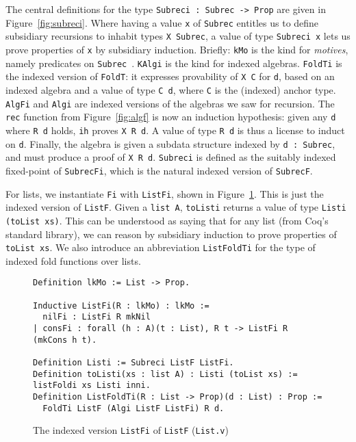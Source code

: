 \documentclass[a4paper,USenglish]{lipics-v2021}
\begin{document}
The central definitions for the type \verb|Subreci : Subrec -> Prop|
are given in Figure~\ref{fig:subreci}.  Where having a value \verb|x|
of \verb|Subrec| entitles us to define subsidiary recursions to
inhabit types \verb|X Subrec|, a value of type \verb|Subreci x| lets
us prove properties of \verb|x| by subsidiary induction.  Briefly:
\verb|kMo| is the kind for \emph{motives}, namely predicates on
\verb|Subrec|~\cite{mcbride00}.  \verb|KAlgi| is the kind for indexed
algebras.  \verb|FoldTi| is the indexed version of \verb|FoldT|: it
expresses provability of \verb|X C| for \verb|d|, based on an indexed
algebra and a value of type \verb|C d|, where \verb|C| is the (indexed) anchor
type.  \verb|AlgFi| and \verb|Algi| are indexed versions
of the algebras we saw for recursion.  The \verb|rec| function from
Figure~\ref{fig:algf} is now an induction hypothesis: given
any \verb|d| where \verb|R d| holds, \verb|ih| proves \verb|X R d|.  A
value of type \verb|R d| is thus a license to induct on \verb|d|.
Finally, the algebra is given a subdata structure indexed by
\verb|d : Subrec|, and must produce a proof of \verb|X R d|.  \verb|Subreci|
is defined as the suitably indexed fixed-point of \verb|SubrecFi|, which
is the natural indexed version of \verb|SubrecF|.

For lists, we instantiate \verb|Fi| with \verb|ListFi|, shown in
Figure~\ref{fig:listfi}.  This is just the indexed version of
\verb|ListF|.  Given a \verb|list A|, \verb|toListi| returns
a value of type \verb|Listi (toList xs)|.  This can be understood
as saying that for any list (from Coq's standard library),
we can reason by subsidiary induction to prove properties of \verb|toList xs|.
We also introduce an abbreviation \verb|ListFoldTi| for the type
of indexed fold functions over lists.

\begin{figure}
\begin{verbatim}
Definition lkMo := List -> Prop.

Inductive ListFi(R : lkMo) : lkMo :=
  nilFi : ListFi R mkNil
| consFi : forall (h : A)(t : List), R t -> ListFi R (mkCons h t).

Definition Listi := Subreci ListF ListFi.
Definition toListi(xs : list A) : Listi (toList xs) := listFoldi xs Listi inni.
Definition ListFoldTi(R : List -> Prop)(d : List) : Prop :=
  FoldTi ListF (Algi ListF ListFi) R d.
\end{verbatim}
\caption{The indexed version \texttt{ListFi} of \texttt{ListF} (\texttt{List.v})}
\label{fig:listfi}
\end{figure}
\end{document}
